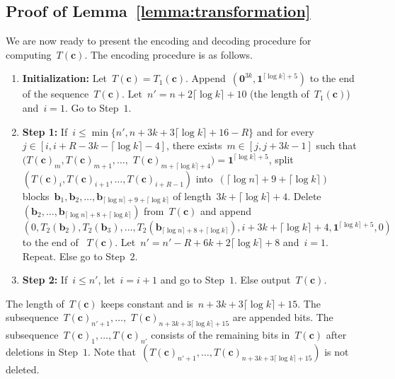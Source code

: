 \documentclass[10pt,a4paper,onecolumn]{IEEEtran}
\newcommand{\1}{\mathbbold{1}}
\newcommand{\boldb}{\mathbf{b}}
\newcommand{\boldc}{\mathbf{c}}
\begin{document}
\subsection{Proof of Lemma~\ref{lemma:transformation}}\label{subsection:Tfunction}
We are now ready to present the encoding and decoding procedure for computing~$T(\boldc)$.
The encoding procedure is as follows.
\begin{enumerate}
    \item \textbf{Initialization:} Let~$T(\boldc)=T_1(\boldc)$.
    Append~$(\boldsymbol{0}^{3k},\boldsymbol{1}^{\lceil \log k \rceil +5})$ to the end of the sequence~$T(\boldc)$. Let~$n'=n+2\lceil\log k\rceil+10$ (the length of~$T_1(\boldc)$) and~$i=1$.
    Go to Step~$1$.
    \item \textbf{Step 1:} If~$i\le \min\{n',n+3k+3\lceil\log k\rceil+16-R\}$ and
    for every~$j\in [i,i+R-3k-\lceil \log k\rceil-4]$, there exists~$m\in [j,j+3k-1]$ such that~$(T(\boldc)_m,T(\boldc)_{m+1},\ldots,$ $T(\boldc)_{m+\lceil \log k \rceil +4})=\boldsymbol{1}^{\lceil \log k \rceil +5}$, split~$(T(\boldc)_i,T(\boldc)_{i+1},\ldots,T(\boldc)_{i+R-1})$ into~$(\lceil \log n\rceil +9+\lceil\log k\rceil)$ blocks~$\boldb_1,\boldb_2,\ldots,\boldb_{\lceil \log n\rceil +9+\lceil\log k\rceil}$ of length~$3k+\lceil \log k \rceil +4$. Delete~$(\boldb_2,\ldots,\boldb_{\lceil \log n\rceil +8+\lceil\log k\rceil})$ from~$T(\boldc)$ and append~$(0,T_2(\boldb_2),T_2(\boldb_3),\ldots,T_2(\boldb_{\lceil \log n\rceil+8+\lceil\log k\rceil}),i+3k+\lceil\log k\rceil+4,\boldsymbol{1}^{\lceil\log k\rceil+5},0)$ to the end of
    ~$T(\boldc)$. Let~$n'=n'-R+6k+2\lceil\log k\rceil+8$ and~$i=1$. Repeat.
    Else go to Step~$2$.
    \item \textbf{Step 2:}
    If~$i\le n'$, let~$i=i+1$ and go to Step~$1$.
    Else output~$T(\boldc)$. 
\end{enumerate}
The length of~$T(\boldc)$ keeps constant and is~$n+3k+3\lceil\log k\rceil+15$. 
The subsequence~$T(\boldc)_{n'+1},\ldots,$ $T(\boldc)_{n+3k+3\lceil\log k\rceil+15}$ are appended bits. %
The subsequence~$T(\boldc)_1,\ldots,T(\boldc)_{n'}$ consists of the remaining bits in~$T(\boldc)$ after deletions in Step~$1$. Note that~$(T(\boldc)_{n'+1},\ldots,T(\boldc)_{n+3k+3\lceil\log k\rceil+15})$ is not deleted.
\end{document}
